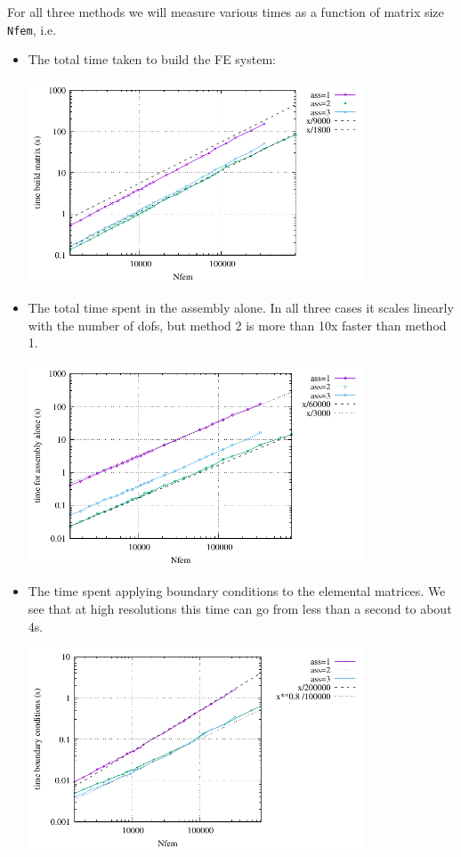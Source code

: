 For all three methods we will measure various times as a function 
of matrix size \lstinline{Nfem}, i.e. 

\begin{itemize}
\item The total time taken to build the FE system: 
\begin{center}
\includegraphics[width=10cm]{python_codes/fieldstone_181/RESULTS/times_build.pdf}
\end{center}
\item The total time spent in the assembly alone. In all three cases it scales 
linearly with the number of dofs, but method 2 is more than 10x faster than method 1. 
\begin{center}
\includegraphics[width=10cm]{python_codes/fieldstone_181/RESULTS/times_assembly.pdf}
\end{center}

\item The time spent applying boundary conditions to the elemental matrices.
We see that at high resolutions this time can go from less than a second to about 4s.

\begin{center}
\includegraphics[width=10cm]{python_codes/fieldstone_181/RESULTS/times_bc.pdf}
\end{center}


\end{itemize}
